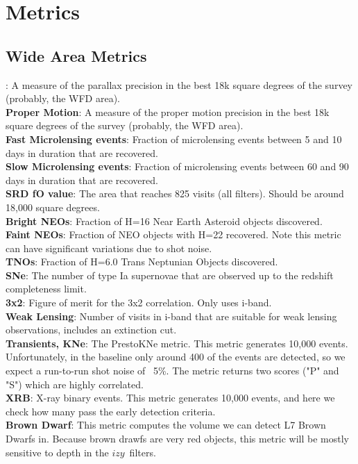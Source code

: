 \section{Metrics}



\subsection{Wide Area Metrics}

: A measure of the parallax precision in the best 18k square degrees of the survey (probably, the WFD area).  \\
{\bf Proper Motion}: A measure of the proper motion precision in the best 18k square degrees of the survey (probably, the WFD area). \\
{\bf Fast Microlensing events}: Fraction of microlensing events between 5 and 10 days in duration that are recovered. \\
{\bf Slow Microlensing events}: Fraction of microlensing events between 60 and 90 days in duration that are recovered.\\
{\bf SRD fO value}: The area that reaches 825 visits (all filters). Should be around 18,000 square degrees. \\
{\bf Bright NEOs}: Fraction of H=16 Near Earth Asteroid objects discovered. \\
{\bf Faint NEOs}: Fraction of NEO objects with H=22 recovered. Note this metric can have significant variations due to shot noise.\\
{\bf TNOs}: Fraction of H=6.0 Trans Neptunian Objects discovered.  \\
{\bf SNe}: The number of type Ia supernovae that are observed up to the redshift completeness limit. \\
{\bf 3x2}: Figure of merit for the 3x2 correlation. Only uses i-band. \\
{\bf Weak Lensing}: Number of visits in i-band that are suitable for weak lensing observations, includes an extinction cut. \\
{\bf Transients, KNe}: The PrestoKNe metric. This metric generates 10,000 events. Unfortunately, in the baseline only around 400 of the events are detected, so we expect a run-to-run shot noise of ~5\%. The metric returns two scores ("P" and "S") which are highly correlated.  \\
{\bf XRB}: X-ray binary events. This metric generates 10,000 events, and here we check how many pass the early detection criteria. \\
{\bf Brown Dwarf}:  This metric computes the volume we can detect L7 Brown Dwarfs in. Because brown drawfs are very red objects, this metric will be mostly sensitive to depth in the $izy$\ filters.\\



